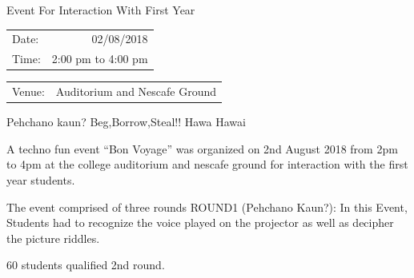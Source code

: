 \documentclass[12pt, a4 paper]{article}
\begin{document}
\begin{center}
\large Event For Interaction With First Year 
\end{center}

\begin{center}
\begin{multicols}{2}
\begin{tabular}{l r}
Date: & 02/08/2018\\ %
Time: & 2:00 pm to 4:00 pm \\ %
\end{tabular}
\columnbreak
\begin{tabular}{l r}
Venue: & Auditorium and Nescafe Ground \\ %
\end{tabular}
\end{multicols}


\begin{LARGE}
Pehchano kaun?   Beg,Borrow,Steal!!    Hawa Hawai
\end{LARGE}

\begin{Large}
\begin{multicols}{2}
A techno fun event “Bon Voyage” was organized on 2nd August 2018 from 2pm to 4pm at the college auditorium and nescafe ground for interaction with the first year students.

\columnbreak
\end{multicols}

\begin{multicols}{2}


\columnbreak
The event comprised of three rounds 
ROUND1 (Pehchano Kaun?): In this Event, Students had to recognize the voice played on the projector as well as decipher the picture riddles.

60 students qualified 2nd round.
\end{multicols}

\newpage 



\end{Large}
\end{center}
\end{document}
